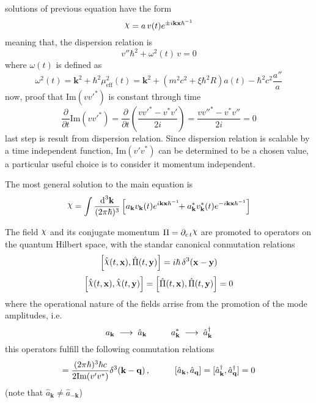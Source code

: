 \documentclass[pt=11, openany,twoside,a4paper]{scrbook}
\DeclareRobustCommand{\rchi}{{\mathpalette\irchi\relax}}
\newcommand{\irchi}[2]{\raisebox{\depth}{$#1\chi$}} %
\begin{document}
	solutions of previous equation have the form
	\begin{equation}
		\rchi=a\,v(t)e^{\pm i\mathbf{kx}\hbar^{-1}}
	\end{equation}
	meaning that, the dispersion relation is
	\begin{equation}
		v''\hbar^2+\omega^2(t)\,v=0
	\end{equation}
	where $\omega(t)$ is defined as
	\begin{equation}
		\omega^2(t)=\mathbf{k}^2+\hbar^2\mu_{\text{eff}}^2(t)=\mathbf{k}^2+\left(m^2c^2+\xi\hbar^2 R\right)a(t)-\hbar^2c^2\frac{a''}{a}
	\end{equation}
	now, proof that Im$(vv'^{*})$ is constant through time
	\begin{equation}
		\frac{\partial}{\partial t}\text{Im}(vv'^{*})=\frac{\partial}{\partial t}\left(\frac{vv'^{*}-v^{*}v'}{2i}\right)=\frac{vv''^*-v^{*}v''}{2i}=0
	\end{equation}
	last step is result from dispersion relation. Since dispersion relation is scalable by a time independent function, Im$(v'v^*)$ can be determined to be a chosen value, a particular useful choice is to consider it momentum independent.
	
	
	
	The most general solution to the main equation is
	\begin{equation}
		\rchi=\int\frac{\td^3\mathbf{k}}{(2\pi\hbar)^3}\left[a_\mathbf{k}v_\mathbf{k}(t)e^{i\mathbf{kx}\hbar^{-1}}\!\!+a_\mathbf{k}^*v_\mathbf{k}^*(t)e^{-i\mathbf{kx}\hbar^{-1}}\right]
	\end{equation}
	
	
	The field $\rchi$ and its conjugate momentum $\Pi=\partial_{c\,t} \rchi$ are promoted to operators on the quantum Hilbert space, with the standar canonical conmutation relations
	\begin{equation}
		\left[\hat{\rchi}(t,\mathbf{x}),\hat{\Pi}(t,\mathbf{y})\right]=i\hbar \,\delta^3(\mathbf{x}-\mathbf{y})
	\end{equation}
	\begin{equation}
		\Big[\hat{\rchi}(t,\mathbf{x}),\hat{\rchi}(t,\mathbf{y})\Big]=\left[\hat{\Pi}(t,\mathbf{x}),\hat{\Pi}(t,\mathbf{y})\right]=0
	\end{equation}
	where the operational nature of the fields arrise from the promotion of the mode amplitudes, i.e.
	\begin{equation}
		a_\mathbf{k}\;\longrightarrow\;\hat{a}_\mathbf{k}\hspace{1.0cm}a_\mathbf{k}^*\;\longrightarrow\;\hat{a}_\mathbf{k}^\dagger
	\end{equation}
	this operators fulfill the following conmutation relations
	\begin{equation}
		[\hat{a}_\mathbf{k},\hat{a}_\mathbf{q}^\dagger]=\frac{(2\pi\hbar)^3\hbar c}{2\text{Im}(v'v^*)}\delta^3(\mathbf{k}-\mathbf{q})\,,\hspace{1.0cm}[\hat{a}_\mathbf{k},\hat{a}_\mathbf{q}]=[\hat{a}_\mathbf{k}^\dagger,\hat{a}_\mathbf{q}^\dagger]=0
	\end{equation}
	(note that $\hat{a}_\mathbf{k}\not=\hat{a}_{-\mathbf{k}}$)
	
\end{document}
